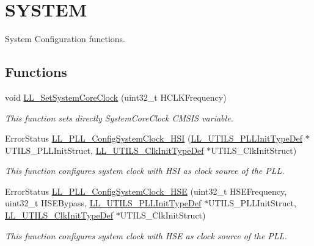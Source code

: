 \hypertarget{group___u_t_i_l_s___e_f___s_y_s_t_e_m}{}\section{S\+Y\+S\+T\+EM}
\label{group___u_t_i_l_s___e_f___s_y_s_t_e_m}


System Configuration functions.  


\subsection*{Functions}
\begin{DoxyCompactItemize}
\item 
void \hyperlink{group___u_t_i_l_s___e_f___s_y_s_t_e_m_ga5af902d59c4c2d9dc5e189df0bc71ecd}{L\+L\+\_\+\+Set\+System\+Core\+Clock} (uint32\+\_\+t H\+C\+L\+K\+Frequency)
\begin{DoxyCompactList}\small\item\em This function sets directly System\+Core\+Clock C\+M\+S\+IS variable. \end{DoxyCompactList}\item 
Error\+Status \hyperlink{group___u_t_i_l_s___e_f___s_y_s_t_e_m_ga7ada5e4210f6ef80ef9f55bf9dd048c6}{L\+L\+\_\+\+P\+L\+L\+\_\+\+Config\+System\+Clock\+\_\+\+H\+SI} (\hyperlink{struct_l_l___u_t_i_l_s___p_l_l_init_type_def}{L\+L\+\_\+\+U\+T\+I\+L\+S\+\_\+\+P\+L\+L\+Init\+Type\+Def} $\ast$U\+T\+I\+L\+S\+\_\+\+P\+L\+L\+Init\+Struct, \hyperlink{struct_l_l___u_t_i_l_s___clk_init_type_def}{L\+L\+\_\+\+U\+T\+I\+L\+S\+\_\+\+Clk\+Init\+Type\+Def} $\ast$U\+T\+I\+L\+S\+\_\+\+Clk\+Init\+Struct)
\begin{DoxyCompactList}\small\item\em This function configures system clock with H\+SI as clock source of the P\+LL. \end{DoxyCompactList}\item 
Error\+Status \hyperlink{group___u_t_i_l_s___e_f___s_y_s_t_e_m_gaf6c8553d03464d4646b63321b97d25e2}{L\+L\+\_\+\+P\+L\+L\+\_\+\+Config\+System\+Clock\+\_\+\+H\+SE} (uint32\+\_\+t H\+S\+E\+Frequency, uint32\+\_\+t H\+S\+E\+Bypass, \hyperlink{struct_l_l___u_t_i_l_s___p_l_l_init_type_def}{L\+L\+\_\+\+U\+T\+I\+L\+S\+\_\+\+P\+L\+L\+Init\+Type\+Def} $\ast$U\+T\+I\+L\+S\+\_\+\+P\+L\+L\+Init\+Struct, \hyperlink{struct_l_l___u_t_i_l_s___clk_init_type_def}{L\+L\+\_\+\+U\+T\+I\+L\+S\+\_\+\+Clk\+Init\+Type\+Def} $\ast$U\+T\+I\+L\+S\+\_\+\+Clk\+Init\+Struct)
\begin{DoxyCompactList}\small\item\em This function configures system clock with H\+SE as clock source of the P\+LL. \end{DoxyCompactList}\end{DoxyCompactItemize}


